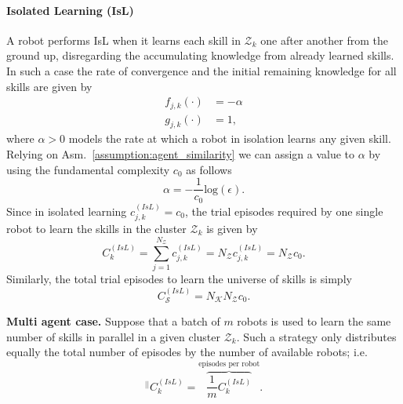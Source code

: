\paragraph{Isolated Learning (IsL)} A robot performs IsL when it learns each skill in $\mathcal{Z}_k$ one after another from the ground up, disregarding the accumulating knowledge from already learned skills. In such a case the rate of convergence and the initial remaining knowledge for all skills are given by
\begin{subequations}\label{eq:fg_isolated}
	\begin{alignat}{2}
		f_{j,k}\left(\cdot \right) &=  -\alpha \\
		g_{j,k}\left(\cdot \right) &= 1,
	\end{alignat}
\end{subequations}
where $ \alpha>0$ models the rate at which a robot in isolation learns any given skill. Relying on Asm.~\ref{assumption:agent_similarity} we can assign a value to $\alpha$ by using the fundamental complexity $c_0$ as follows
\begin{equation}\label{eq:isolated_learning_rate}
	\alpha = -\frac{1}{c_0}\text{log}(\epsilon).
\end{equation}
Since in isolated learning $c^{(IsL)}_{j,k} = c_0$, the trial episodes required by one single robot to learn the skills in the cluster $\mathcal{Z}_k$ is given by
\begin{equation}
	C^{(IsL)}_{k} = \sum_{j=1}^{N_{\mathcal{Z}}} c^{(IsL)}_{j,k}= N_{\mathcal{Z}}  c^{(IsL)}_{j,k} = N_{\mathcal{Z}} c_0.
\end{equation}
Similarly, the total trial episodes to learn the universe of skills is simply
\begin{equation}
	C^{(IsL)}_{\mathcal{S}} = N_\mathcal{K} N_{\mathcal{Z}} c_0.
\end{equation}

\textbf{Multi agent case.} Suppose that a batch of $m$ robots is used to learn the same number of skills in parallel in a given cluster $\mathcal{Z}_k$. Such a strategy only distributes equally the total number of episodes by the number of available robots; i.e.
\begin{equation}
	^{\lvert \lvert}C^{(IsL)}_k=  \overbrace{\frac{1}{m}C^{(IsL)}_k}^{\text{episodes per robot}}.
\end{equation}

